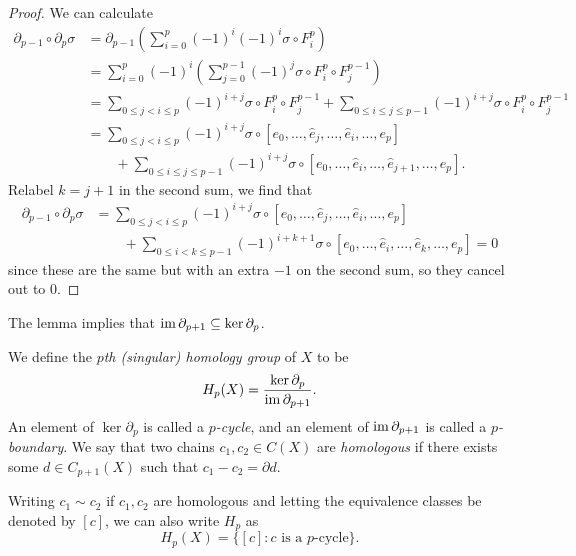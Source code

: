 \begin{proof}
  We can calculate
  \begin{align*}
    \partial_{p - 1} \circ \partial_p \sigma
    &= \partial_{p - 1} \left( \sum_{i = 0}^p (-1)^i (-1)^i \sigma \circ F_i^p \right) \\
    &= \sum_{i = 0}^p (-1)^i \left( \sum_{j = 0}^{p - 1} (-1)^j \sigma \circ F_i^p \circ F_j^{p - 1} \right) \\
    &= \sum_{0 \le j < i \le p} (-1)^{i + j} \sigma \circ F_i^p \circ F_j^{p - 1}
    + \sum_{0 \le i \le j \le p - 1} (-1)^{i + j} \sigma \circ F_i^p \circ F_j^{p - 1} \\
    &= \sum_{0 \le j < i \le p} (-1)^{i + j} \sigma \circ [e_0, \dots, \widehat{e}_j, \dots, \widehat{e}_i, \dots, e_p] \\
    &\quad \quad+ \sum_{0 \le i \le j \le p - 1} (-1)^{i + j} \sigma \circ [e_0, \dots, \widehat{e}_i, \dots, \widehat{e}_{j + 1}, \dots, e_p].
  \end{align*}
  Relabel $k = j + 1$ in the second sum, we find that
  \begin{align*}
    \partial_{p - 1} \circ \partial_p \sigma
    &= \sum_{0 \le j < i \le p} (-1)^{i + j} \sigma \circ [e_0, \dots, \widehat{e}_j, \dots, \widehat{e}_i, \dots, e_p] \\
    &\quad \quad + \sum_{0 \le i < k \le p - 1} (-1)^{i + k + 1} \sigma \circ [e_0, \dots, \widehat{e}_i, \dots, \widehat{e}_{k}, \dots, e_p] = 0
  \end{align*}
  since these are the same but with an extra $-1$ on
  the second sum, so they cancel out to $0$.
\end{proof}

\begin{remark}
  The lemma implies that $\operatorname{im} \partial_{p + 1} \subseteq \ker \partial_p$.
\end{remark}

\begin{definition}
  We define the \emph{$p$th (singular) homology group} of $X$ to be
  \[
    H_p(X) = \frac{\ker \partial_p}{\operatorname{im} \partial_{p + 1}}.
  \]
  An element of $\ker \partial_p$ is called a
  \emph{$p$-cycle}, and an element of $\operatorname{im} \partial_{p + 1}$
  is called a \emph{$p$-boundary}. We say that
  two chains $c_1, c_2 \in C(X)$ are \emph{homologous}
  if there exists some $d \in C_{p + 1}(X)$ such that
  $c_1 - c_2 = \partial d$.

\end{definition}

\begin{remark}
  Writing $c_1 \sim c_2$ if $c_1, c_2$ are homologous
  and
  letting the equivalence classes be denoted
  by $[c]$,
  we can also write $H_p$ as
  \[
    H_p(X) = \{[c] : \text{$c$ is a $p$-cycle}\}.
  \]
\end{remark}

